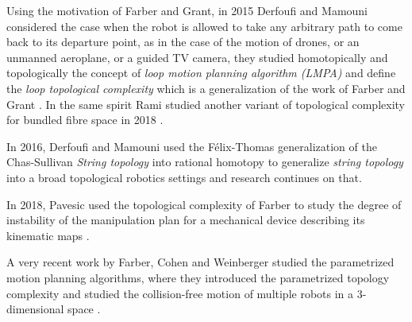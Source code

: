 Using the motivation of Farber and Grant, in 2015 Derfoufi and Mamouni considered the case when the robot is allowed to take any arbitrary path to come back to its departure point, as in the case of the motion of drones, or an unmanned aeroplane, or a guided TV camera, they studied homotopically and topologically the concept of \textit{loop motion planning algorithm (LMPA)}  and define the \textit{loop topological complexity} which is a generalization of the work of Farber and Grant \cite{derfoufi2015loop}. In the same spirit Rami  studied another variant of topological complexity for bundled fibre space in 2018 \cite{rami2018variant}.

In 2016, Derfoufi and Mamouni used the F\'elix-Thomas generalization of the Chas-Sullivan \textit{String topology} into rational homotopy to generalize \textit{string topology} into a broad topological robotics settings and research continues on that.

In 2018, Pavesic used the topological complexity of Farber to study the degree of instability of the manipulation plan for a mechanical device describing its kinematic maps \cite{pavesic2018topologist}.

A very recent work by Farber, Cohen and Weinberger studied the parametrized motion planning algorithms, where they introduced the parametrized topology complexity and studied the collision-free motion of multiple robots in a 3-dimensional space \cite{cohen2021topology}.


